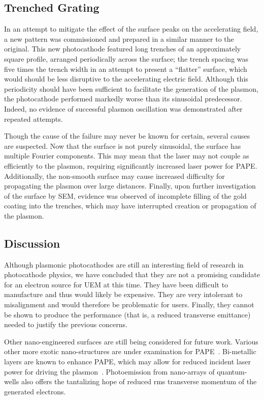 \subsection{Trenched Grating}

In an attempt to mitigate the effect of the surface peaks on the accelerating field, a new pattern was commissioned and prepared in a similar manner to the original.
This new photocathode featured long trenches of an approximately square profile, arranged periodically across the surface; the trench spacing was five times the trench width in an attempt to present a ``flatter'' surface, which would should be less disruptive to the accelerating electric field.
Although this periodicity should have been sufficient to facilitate the generation of the plasmon, the photocathode performed markedly worse than its sinusoidal predecessor.
Indeed, no evidence of successful plasmon oscillation was demonstrated after repeated attempts.

Though the cause of the failure may never be known for certain, several causes are suspected.
Now that the surface is not purely sinusoidal, the surface has multiple Fourier components.
This may mean that the laser may not couple as efficiently to the plasmon, requiring significantly increased laser power for PAPE. 
Additionally, the non-smooth surface may cause increased difficulty for propagating the plasmon over large distances.
Finally, upon further investigation of the surface by SEM, evidence was observed of incomplete filling of the gold coating into the trenches, which may have interrupted creation or propagation of the plasmon.

\subsection{Discussion}

Although plasmonic photocathodes are still an interesting field of research in photocathode physics, we have concluded that they are not a promising candidate for an electron source for UEM at this time.
They have been difficult to manufacture and thus would likely be expensive.
They are very intolerant to misalignment and would therefore be problematic for users.
Finally, they cannot be shown to produce the performance (that is, a reduced transverse emittance) needed to justify the previous concerns.

Other nano-engineered surfaces are still being considered for future work.
Various other more exotic nano-structures are under examination for PAPE~\cite{li_surface_2013,polyakov_plasmon_2013}.
Bi-metallic layers are known to enhance PAPE, which may allow for reduced incident laser power for driving the plasmon~\cite{kupersztych_anomalous_2005}.
Photoemission from nano-arrays of quantum-wells also offers the tantalizing hope of reduced rms transverse momentum of the generated electrons.

